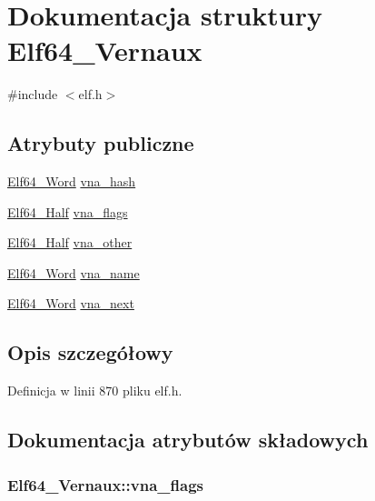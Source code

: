 \hypertarget{struct_elf64___vernaux}{\section{Dokumentacja struktury Elf64\-\_\-\-Vernaux}
\label{struct_elf64___vernaux}
}


{\ttfamily \#include $<$elf.\-h$>$}

\subsection*{Atrybuty publiczne}
\begin{DoxyCompactItemize}
\item 
\hyperlink{elf_8h_aa3aa1920ed115b7ef7e99716fece4401}{Elf64\-\_\-\-Word} \hyperlink{struct_elf64___vernaux_ae41cce47b72e2232f3880843ab550649}{vna\-\_\-hash}
\item 
\hyperlink{elf_8h_adb6a5584018b431da3472e7c6a7fd731}{Elf64\-\_\-\-Half} \hyperlink{struct_elf64___vernaux_a1c5aa72ab842b4338ba2576d5f014700}{vna\-\_\-flags}
\item 
\hyperlink{elf_8h_adb6a5584018b431da3472e7c6a7fd731}{Elf64\-\_\-\-Half} \hyperlink{struct_elf64___vernaux_a56e3d7fee69c7b55556297757e1977e5}{vna\-\_\-other}
\item 
\hyperlink{elf_8h_aa3aa1920ed115b7ef7e99716fece4401}{Elf64\-\_\-\-Word} \hyperlink{struct_elf64___vernaux_a4c83e76a256ad7fe7058df7ee9493c5c}{vna\-\_\-name}
\item 
\hyperlink{elf_8h_aa3aa1920ed115b7ef7e99716fece4401}{Elf64\-\_\-\-Word} \hyperlink{struct_elf64___vernaux_a565bd1e8b3ae2f45854f8163629444fc}{vna\-\_\-next}
\end{DoxyCompactItemize}


\subsection{Opis szczegółowy}


Definicja w linii 870 pliku elf.\-h.



\subsection{Dokumentacja atrybutów składowych}
\hypertarget{struct_elf64___vernaux_a1c5aa72ab842b4338ba2576d5f014700}{
\subsubsection[{vna\-\_\-flags}]{ Elf64\-\_\-\-Vernaux\-::vna\-\_\-flags}}\label{struct_elf64___vernaux_a1c5aa72ab842b4338ba2576d5f014700}


